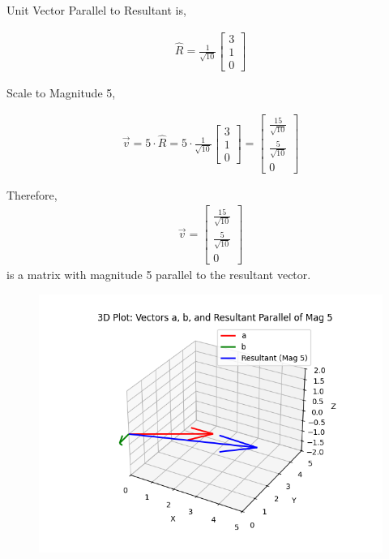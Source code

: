 \documentclass[journal]{IEEEtran}
\begin{document}
Unit Vector Parallel to Resultant is,


\begin{align}
{\hat{R}} = \frac{1}{\sqrt{10}} \begin{bmatrix} 3 \\ 1 \\ 0 \end{bmatrix}
\end{align}


Scale to Magnitude 5,

\begin{align}
\vec{v} = 5 \cdot {\hat{R}} = 5 \cdot \frac{1}{\sqrt{10}} \begin{bmatrix} 3 \\ 1 \\ 0 \end{bmatrix}
= \begin{bmatrix} \frac{15}{\sqrt{10}} \\ \frac{5}{\sqrt{10}} \\ 0 \end{bmatrix}
\end{align}

Therefore,
\begin{align}
\vec{v} = \begin{bmatrix}
\frac{15}{\sqrt{10}} \\
\frac{5}{\sqrt{10}} \\
0
\end{bmatrix}
\end{align}
is a matrix with magnitude 5 parallel to the resultant vector.

\begin{figure}[H]
\begin{center}
\includegraphics[width=0.75\columnwidth]{figs/graph.png}
\end{center}
\caption{}
\label{fig:Fig}
\end{figure}
\end{document}
